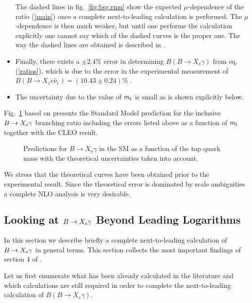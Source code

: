 \begin{itemize}
The dashed lines in fig.\ \ref{fig:bsg:rmu} show the expected
$\mu$-dependence of the ratio (\ref{main}) once a complete
next-to-leading calculation is performed. The $\mu$-dependence is then
much weaker, but until one performs the calculation explicitly one
cannot say which of the dashed curves is the proper one. The way the
dashed lines are obtained is described in \cite{BMMP:94}.
\item	
Finally, there exists a $\pm 2.4\%$ error in determining $B(B \to
X_s \gamma)$ from eq. (\ref{ratios}), which is due to the error in the
experimental measurement of $B(B \to X_c e \bar{\nu}_e) = (10.43 \pm
0.24)\%$ \cite{particledata:94}.
\item
The uncertainty due to the value of $m_{\rm t}$ is small as is shown
explicitly below.
\end{itemize} 


Fig.\ \ref{fig:bsg:brmt} based on \cite{BMMP:94} presents the Standard
Model prediction for the inclusive $B \to X_s \gamma$ branching ratio including the
errors listed above as a function of $m_{\rm t}$ together with the CLEO
result.

\begin{figure}[hbt]
\vspace{0.10in}
\centerline{
\epsfysize=5in
}
\vspace{0.08in}
\caption[]{
Predictions for $B \to X_s \gamma$ in the SM as a function of the top
quark mass with the theoretical uncertainties taken into account.
\label{fig:bsg:brmt}}
\end{figure}

We stress that the theoretical curves have been obtained prior to the
experimental result. Since the theoretical error is dominated by scale
ambiguities a complete NLO analysis is very desirable.

\subsection { Looking at $B \to X_s \gamma$ Beyond Leading Logarithms}
         \label{sec:Heff:Bsgamma:nlo}
In this section we describe briefly a complete next-to-leading
calculation of $B \to X_s \gamma$ in general terms. 
This section collects the most important findings of section 4 of
\cite{BMMP:94}.

Let us first enumerate what has been already calculated in the
literature and which calculations are still required in order to
complete the next-to-leading calculation of $B(B \to X_s \gamma)$.


